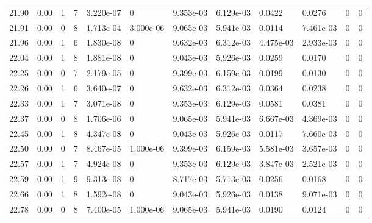 \documentclass[preview]{standalone}
\begin{document}
{{{{{{{{\begin{tabular}{L{1.2cm}C{1.2cm} C{0.3cm}C{0.5cm} C{1.4cm}C{1.4cm} C{1.4cm}C{1.4cm} C{1.6cm}C{1.6cm} C{1.6cm}C{1.6cm}}
  21.90  &  0.00  & 1     &  7 &  3.220e-07  & 0  &  9.353e-03&   6.129e-03& 0.0422 & 0.0276   &  0 & 0  \\ 
  21.91  &  0.00  & 0     &  8 &  1.713e-04  & 3.000e-06  &  9.065e-03&   5.941e-03& 0.0114 & 7.461e-03   &  0 & 0  \\ 
  21.96  &  0.00  & 1     &  6 &  1.830e-08  & 0  &  9.632e-03&   6.312e-03& 4.475e-03 & 2.933e-03   &  0 & 0  \\ 
  22.04  &  0.00  & 1     &  8 &  1.881e-08  & 0  &  9.043e-03&   5.926e-03& 0.0259 & 0.0170   &  0 & 0  \\ 
  22.25  &  0.00  & 0     &  7 &  2.179e-05  & 0  &  9.399e-03&   6.159e-03& 0.0199 & 0.0130   &  0 & 0  \\ 
  22.26  &  0.00  & 1     &  6 &  3.640e-07  & 0  &  9.632e-03&   6.312e-03& 0.0364 & 0.0238   &  0 & 0  \\ 
  22.33  &  0.00  & 1     &  7 &  3.071e-08  & 0  &  9.353e-03&   6.129e-03& 0.0581 & 0.0381   &  0 & 0  \\ 
  22.37  &  0.00  & 0     &  8 &  1.706e-06  & 0  &  9.065e-03&   5.941e-03& 6.667e-03 & 4.369e-03   &  0 & 0  \\ 
  22.45  &  0.00  & 1     &  8 &  4.347e-08  & 0  &  9.043e-03&   5.926e-03& 0.0117 & 7.660e-03   &  0 & 0  \\ 
  22.50  &  0.00  & 0     &  7 &  8.467e-05  & 1.000e-06  &  9.399e-03&   6.159e-03& 5.581e-03 & 3.657e-03   &  0 & 0  \\ 
  22.57  &  0.00  & 1     &  7 &  4.924e-08  & 0  &  9.353e-03&   6.129e-03& 3.847e-03 & 2.521e-03   &  0 & 0  \\ 
  22.59  &  0.00  & 1     &  9 &  9.313e-08  & 0  &  8.717e-03&   5.713e-03& 0.0256 & 0.0168   &  0 & 0  \\ 
  22.66  &  0.00  & 1     &  8 &  1.592e-08  & 0  &  9.043e-03&   5.926e-03& 0.0138 & 9.071e-03   &  0 & 0  \\ 
  22.78  &  0.00  & 0     &  8 &  7.400e-05  & 1.000e-06  &  9.065e-03&   5.941e-03& 0.0190 & 0.0124   &  0 & 0  \\ 
\hline 
\end{tabular} 

}}}}}}}}
\end{document}
